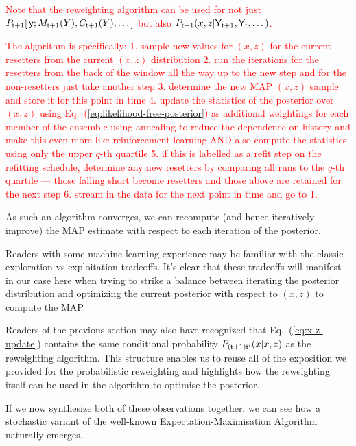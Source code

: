 \textcolor{red}{Note that the reweighting algorithm can be used for not just $P_{{\sf t}+1}[\,{\sf y};M_{{\sf t}+1}(Y),C_{{\sf t}+1}(Y), \dots ]$ but also $P_{{\sf t}+1}(x,z\vert {\sf Y}_{{\sf t}+1}, {\sf Y}_{{\sf t}}, \dots )$.}

\textcolor{red}{The algorithm is specifically: 
1. sample new values for $(x,z)$ for the current resetters from the current $(x,z)$ distribution
2. run the iterations for the resetters from the back of the window all the way up to the new step and for the non-resetters just take another step
3. determine the new MAP $(x,z)$ sample and store it for this point in time 
4. update the statistics of the posterior over $(x,z)$ using Eq.~(\ref{eq:likelihood-free-posterior}) as additional weightings for each member of the ensemble using annealing to reduce the dependence on history and make this even more like reinforcement learning AND also compute the statistics using only the upper $q$-th quartile 
5. if this is labelled as a refit step on the refitting schedule, determine any new resetters by comparing all runs to the $q$-th quartile --- those falling short become resetters and those above are retained for the next step
6. stream in the data for the next point in time and go to 1.}


As such an algorithm converges, we can recompute (and hence iteratively improve) the MAP estimate with respect to each iteration of the posterior.

Readers with some machine learning experience may be familiar with the classic exploration vs exploitation tradeoffs. It's clear that these tradeoffs will manifest in our case here when trying to strike a balance between iterating the posterior distribution and optimizing the current posterior with respect to $(x,z)$ to compute the MAP. 

Readers of the previous section may also have recognized that Eq.~(\ref{eq:x-z-update}) contains the same conditional probability $P_{({\sf t}+1){\sf t}'}(x\vert x,z)$ as the reweighting algorithm. This structure enables us to reuse all of the exposition we provided for the probabilistic reweighting and highlights how the reweighting itself can be used in the algorithm to optimise the posterior.   

If we now synthesize both of these observations together, we can see how a stochastic variant of the well-known Expectation-Maximisation Algorithm~\cite{hartley1958maximum, dempster1977maximum, murphy2012machine} naturally emerges.


